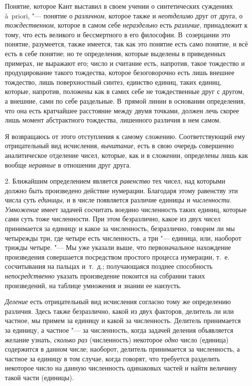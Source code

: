 Понятие, которое Кант выставил в своем учении о синтетических суждениях
à~priori, "--- понятие о {\em различном}, которое также и
{\em неотделимо} друг от друга, о
{\em тождественном}, которое в самом себе
{\em нераздельно} есть
{\em различие}, принадлежит к тому, что есть великого и
бессмертного в его философии. В~созерцании это понятие, разумеется, также
имеется, так как это понятие есть само понятие, и всё есть в себе понятие;
но те определения, которые выделены в приведенных примерах, не выражают
его; число и считание есть, напротив, такое тождество и продуцирование
такого тождества, которое безоговорочно есть лишь внешнее тождество, лишь
поверхностный синтез, единство единиц, таких единиц, которые, напротив,
положены как в самих себе не тождественные друг с другом, а внешние, сами
по себе раздельные. В~прямой линии в основании определения, что она есть
кратчайшее расстояние между двумя точками, должен лечь скорее лишь момент
абстрактного тождества, лишенного различия в нем самом.

Я возвращаюсь от этого отступления к самому сложению. Соответствующий ему
отрицательный вид исчисления, {\em вычитание}, есть в
свою очередь совершенно аналитическое отделение чисел, которые, как и в
сложении, определены лишь как вообще {\em неравные} в
отношении друг друга.

2. Ближайшим определением является {\em равенство} тех
чисел, над которыми должно быть произведено действие нумерации. Благодаря
этому равенству эти числа суть {\em единицы}, и в числе
появляется различие единицы и {\em численности}.
{\em Умножение} имеет задачей сосчитать воедино
численность таких единиц, которые сами суть тоже численности. При этом
безразлично, какое из двух чисел принимается за единицу и какое за
численность, безразлично, говорим ли мы четырежды три, где четыре есть
численность, а три "--- единица, или, наоборот трижды четыре. "--- Мы уже указали
выше, что первоначальное нахождение произведения совершается посредством
простого процесса нумерации, т.~е. сосчитывания на пальцах и~т.~д.;
получающаяся позднее способность {\em непосредственно}
указать произведение покоится на собрании таких произведений, на таблице
умножения и знании ее наизусть.

{\em Деление} есть отрицательный вид исчисления согласно
тому же определению различия. Здесь также безразлично, какой из двух
факторов, делитель ли или частное, мы примем за единицу и какой за
численность. Делитель принимается за единицу, а частное "--- за численность,
когда задачей деления объявляется желание узнать,
{\em сколько раз} (численность) некоторое
{\em одно} число (единица) содержится в данном числе;
наоборот, делитель принимается за численность, а частное за единицу в том
случае, когда говорят, что требуется разделить некоторое число на данную
численность одинаковых частей и найти величину такой части (единицы).

